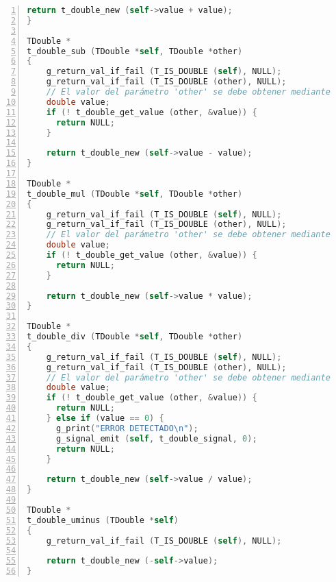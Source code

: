 \begin{lstlisting}[language=C, numbers=left]
    return t_double_new (self->value + value);
}

TDouble *
t_double_sub (TDouble *self, TDouble *other)
{
    g_return_val_if_fail (T_IS_DOUBLE (self), NULL);
    g_return_val_if_fail (T_IS_DOUBLE (other), NULL);
    // El valor del parámetro 'other' se debe obtener mediante el método 'getter'
    double value;
    if (! t_double_get_value (other, &value)) {
      return NULL;
    }

    return t_double_new (self->value - value);
}

TDouble *
t_double_mul (TDouble *self, TDouble *other)
{
    g_return_val_if_fail (T_IS_DOUBLE (self), NULL);
    g_return_val_if_fail (T_IS_DOUBLE (other), NULL);
    // El valor del parámetro 'other' se debe obtener mediante el método 'getter'
    double value;
    if (! t_double_get_value (other, &value)) {
      return NULL;
    }

    return t_double_new (self->value * value);
}

TDouble *
t_double_div (TDouble *self, TDouble *other)
{
    g_return_val_if_fail (T_IS_DOUBLE (self), NULL);
    g_return_val_if_fail (T_IS_DOUBLE (other), NULL);
    // El valor del parámetro 'other' se debe obtener mediante el método 'getter'
    double value;
    if (! t_double_get_value (other, &value)) {
      return NULL;
    } else if (value == 0) {
      g_print("ERROR DETECTADO\n");
      g_signal_emit (self, t_double_signal, 0);
      return NULL;
    }
    
    return t_double_new (self->value / value);
}

TDouble *
t_double_uminus (TDouble *self)
{
    g_return_val_if_fail (T_IS_DOUBLE (self), NULL);

    return t_double_new (-self->value);
}
\end{lstlisting}

